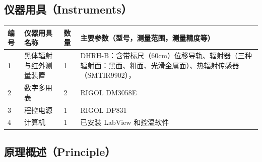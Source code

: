 \documentclass[dvipsnames, svgnames,a4paper,11pt]{article}
\begin{document}
	\subsection{仪器用具（Instruments）}
	\begin{table}[htbp]
		\centering
		\renewcommand\arraystretch{1.6}
		\begin{tabular}{p{}|p{}|p{}|p{}}
			\hline
			编号& 仪器用具名称 & 数量 &  主要参数（型号，测量范围，测量精度等） \\
			\hline
			1&黑体辐射与红外测量装置 	&1 	& DHRH-B：含带标尺（60cm）位移导轨、辐射器（三种辐射面：黑面、粗面、光滑金属面）、热辐射传感器（SMTIR9902），\\
			
			2&数字多用表 & 2	& RIGOL DM3058E \\
			
			3&程控电源 	& 1 & RIGOL DP831\\
			
			4&计算机 &1 &已安装 LabView 和控温软件 \\
			\hline
		\end{tabular}
	\end{table}
	
	\subsection{原理概述（Principle）}
	
\end{document}
